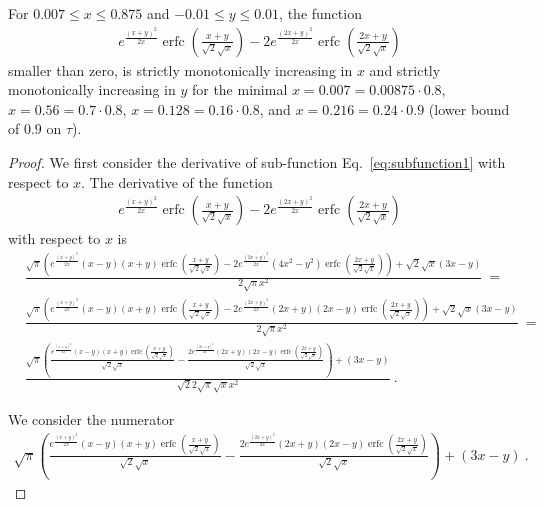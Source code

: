 \documentclass{article}
\renewcommand{\leq}{\leqslant}
\DeclareMathOperator{\erfc}{erfc}
\begin{document}
\begin{lemma}
\label{proof:mainsubfunctionbelow} 
For $0.007 \leq x \leq 0.875$ and $-0.01 \leq y \leq 0.01$, 
the function
\begin{align}
e^{\frac{(x+y)^2}{2 x}} \erfc \left(\frac{x+y}{\sqrt{2} \sqrt{x}}\right)-2 e^{\frac{(2 x+y)^2}{2 x}} \erfc \left(\frac{2 x+y}{\sqrt{2} \sqrt{x}}\right)
\end{align}
smaller than zero, is strictly monotonically increasing in $x$
and strictly monotonically increasing in $y$ for the minimal $x=0.007=0.00875 \cdot 0.8$,
$x=0.56=0.7 \cdot 0.8$, $x=0.128=0.16 \cdot 0.8$, and $x=0.216=0.24 \cdot 0.9$ (lower
bound of $0.9$ on $\tau$).
\end{lemma}


\begin{proof}
We first consider the derivative of sub-function
Eq.~\eqref{eq:subfunction1} with respect to $x$.
The derivative of the function 
\begin{align}
e^{\frac{(x+y)^2}{2 x}} \erfc \left(\frac{x+y}{\sqrt{2} \sqrt{x}}\right)-2 e^{\frac{(2 x+y)^2}{2 x}} \erfc \left(\frac{2 x+y}{\sqrt{2} \sqrt{x}}\right)
\end{align}
with respect to $x$ is
\begin{align}
&\frac{\sqrt{\pi } \left(e^{\frac{(x+y)^2}{2 x}} (x-y) (x+y)
  \erfc \left(\frac{x+y}{\sqrt{2} \sqrt{x}}\right)-2 e^{\frac{(2
  x+y)^2}{2 x}} \left(4 x^2-y^2\right) \erfc \left(\frac{2
  x+y}{\sqrt{2} \sqrt{x}}\right)\right)+\sqrt{2} \sqrt{x} (3 x-y)}{2
  \sqrt{\pi } x^2}\ = \\ \nonumber &\frac{\sqrt{\pi } \left(e^{\frac{(x+y)^2}{2 x}}
  (x-y) (x+y) \erfc \left(\frac{x+y}{\sqrt{2} \sqrt{x}}\right)-2
  e^{\frac{(2 x+y)^2}{2 x}} (2 x+y) (2 x-y) \erfc \left(\frac{2
  x+y}{\sqrt{2} \sqrt{x}}\right)\right)+\sqrt{2} \sqrt{x} (3 x-y)}{2
  \sqrt{\pi } x^2} \ = \\ \nonumber &\frac{\sqrt{\pi } \left(\frac{e^{\frac{(x+y)^2}{2
  x}} (x-y) (x+y) \erfc \left(\frac{x+y}{\sqrt{2}
  \sqrt{x}}\right)}{\sqrt{2} \sqrt{x}}-\frac{2 e^{\frac{(2 x+y)^2}{2
  x}} (2 x+y) (2 x-y) \erfc \left(\frac{2 x+y}{\sqrt{2}
  \sqrt{x}}\right)}{\sqrt{2} \sqrt{x}}\right)+(3 x-y)}{\sqrt{2} 2
  \sqrt{\pi } \sqrt{x} x^2} \ .
\end{align} 


We consider the numerator
\begin{align}
\sqrt{\pi } \left(\frac{e^{\frac{(x+y)^2}{2 x}} (x-y) (x+y)
  \erfc \left(\frac{x+y}{\sqrt{2} \sqrt{x}}\right)}{\sqrt{2}
  \sqrt{x}}-\frac{2 e^{\frac{(2 x+y)^2}{2 x}} (2 x+y) (2 x-y)
  \erfc \left(\frac{2 x+y}{\sqrt{2} \sqrt{x}}\right)}{\sqrt{2}
  \sqrt{x}}\right)+(3 x-y) \ .
\end{align}


\end{proof}
\end{document}
